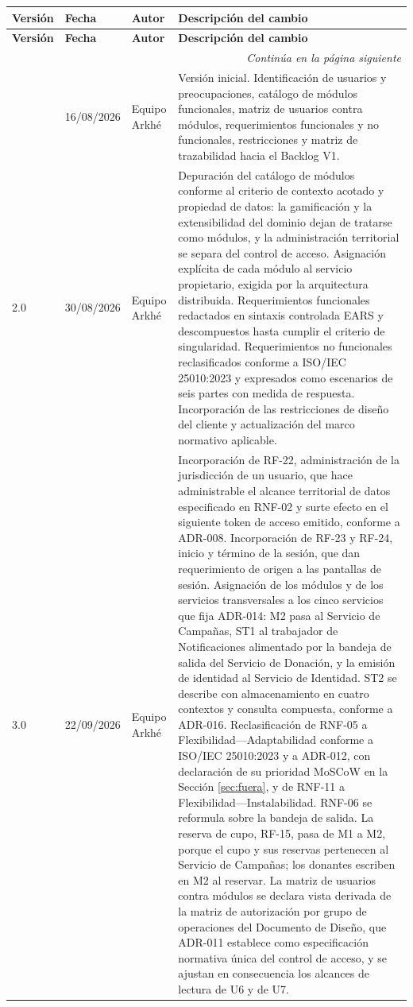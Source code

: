 \documentclass[11pt,a4paper]{article}
\newcommand{\contnota}[1]{\midrule \multicolumn{#1}{r}{\footnotesize\itshape Continúa en la página siguiente}\\}
\begin{document}
\begin{longtable}{L{1.4cm} L{1.8cm} L{2.2cm} L{8.4cm}}
\toprule
\textbf{Versión} & \textbf{Fecha} & \textbf{Autor} & \textbf{Descripción del cambio} \\
\midrule
\endfirsthead
\toprule
\textbf{Versión} & \textbf{Fecha} & \textbf{Autor} & \textbf{Descripción del cambio} \\
\midrule
\endhead
\contnota{4}
\endfoot
\bottomrule
{} & 16/08/2026 & Equipo Arkhé & Versión inicial. Identificación de usuarios y preocupaciones, catálogo de módulos funcionales, matriz de usuarios contra módulos, requerimientos funcionales y no funcionales, restricciones y matriz de trazabilidad hacia el Backlog V1. \\
2.0 & 30/08/2026 & Equipo Arkhé & Depuración del catálogo de módulos conforme al criterio de contexto acotado y propiedad de datos: la gamificación y la extensibilidad del dominio dejan de tratarse como módulos, y la administración territorial se separa del control de acceso. Asignación explícita de cada módulo al servicio propietario, exigida por la arquitectura distribuida. Requerimientos funcionales redactados en sintaxis controlada EARS y descompuestos hasta cumplir el criterio de singularidad. Requerimientos no funcionales reclasificados conforme a ISO/IEC 25010:2023 y expresados como escenarios de seis partes con medida de respuesta. Incorporación de las restricciones de diseño del cliente y actualización del marco normativo aplicable. \\
3.0 & 22/09/2026 & Equipo Arkhé & Incorporación de RF-22, administración de la jurisdicción de un usuario, que hace administrable el alcance territorial de datos especificado en RNF-02 y surte efecto en el siguiente token de acceso emitido, conforme a ADR-008. Incorporación de RF-23 y RF-24, inicio y término de la sesión, que dan requerimiento de origen a las pantallas de sesión. Asignación de los módulos y de los servicios transversales a los cinco servicios que fija ADR-014: M2 pasa al Servicio de Campañas, ST1 al trabajador de Notificaciones alimentado por la bandeja de salida del Servicio de Donación, y la emisión de identidad al Servicio de Identidad. ST2 se describe con almacenamiento en cuatro contextos y consulta compuesta, conforme a ADR-016. Reclasificación de RNF-05 a Flexibilidad---Adaptabilidad conforme a ISO/IEC 25010:2023 y a ADR-012, con declaración de su prioridad MoSCoW en la Sección \ref{sec:fuera}, y de RNF-11 a Flexibilidad---Instalabilidad. RNF-06 se reformula sobre la bandeja de salida. La reserva de cupo, RF-15, pasa de M1 a M2, porque el cupo y sus reservas pertenecen al Servicio de Campañas; los donantes escriben en M2 al reservar. La matriz de usuarios contra módulos se declara vista derivada de la matriz de autorización por grupo de operaciones del Documento de Diseño, que ADR-011 establece como especificación normativa única del control de acceso, y se ajustan en consecuencia los alcances de lectura de U6 y de U7. \\

\end{longtable}
\end{document}
